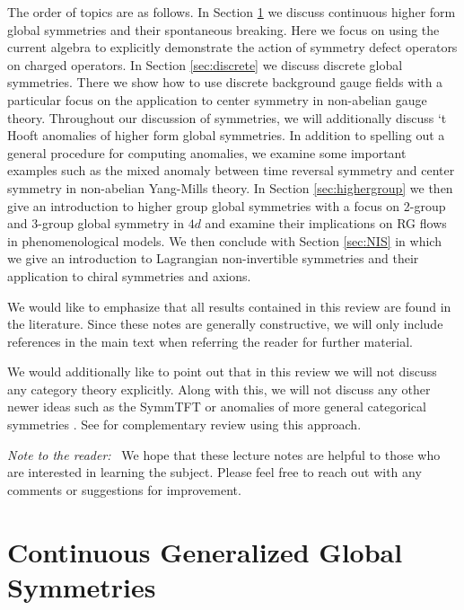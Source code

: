 \documentclass[11pt]{article}
\begin{document}
The order of topics are as follows. 
In Section \ref{sec:continuous higher-form} we discuss continuous higher form global symmetries and their spontaneous breaking. Here we focus on using the current algebra to explicitly demonstrate the action of symmetry defect operators on charged operators. In Section \ref{sec:discrete} we discuss discrete global symmetries. There we show how to use discrete background gauge fields with a particular focus on the application to center symmetry in non-abelian gauge theory. Throughout our discussion of symmetries, we will additionally discuss  `t Hooft anomalies of higher form global symmetries. In addition to spelling out a general procedure for computing anomalies, we examine some important examples such as the mixed anomaly between time reversal symmetry and center symmetry in non-abelian Yang-Mills theory. In Section \ref{sec:highergroup} we then give an introduction to higher group global symmetries with a focus on 2-group and 3-group global symmetry in $4d$ and examine their implications on RG flows in phenomenological models. We then conclude with Section \ref{sec:NIS} in which we give an introduction to Lagrangian non-invertible symmetries and their application to chiral symmetries and axions. 

We would like to emphasize that all results contained in this review are found in the literature. Since these notes are generally constructive, we will only include references in the main text when referring the reader for further material. 

We would additionally like to point out that in this review we will not discuss any category theory explicitly. Along with this, we will not discuss any other newer ideas such as the SymmTFT \cite{Freed:2022qnc,Freed:2022iao,Kaidi:2022cpf,Apruzzi:2021nmk} or anomalies of more general categorical symmetries \cite{Kaidi:2023maf,Zhang:2023wlu,Choi:2023xjw}. See \cite{Schafer-Nameki:2023jdn} for complementary review using this approach. 


\bigskip
\noindent \emph{Note to  the reader:}~
We hope that these lecture notes are helpful to those who are interested in learning the subject. Please feel free to reach out with any comments or suggestions for improvement. 

\section{Continuous Generalized Global Symmetries}
\label{sec:continuous higher-form}
\end{document}
